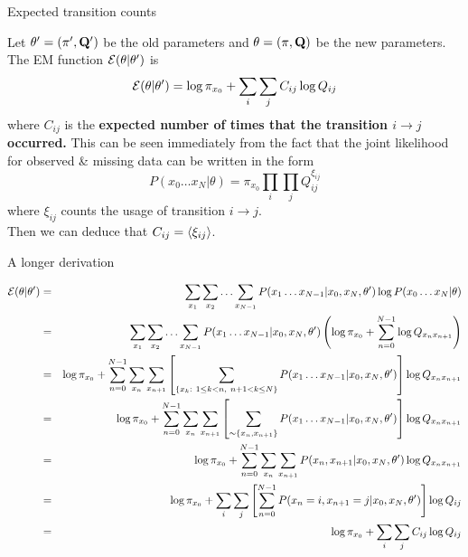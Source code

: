 \documentclass{beamer}
\begin{document}
\begin{frame}{Expected transition counts}
 \itemb
 \item Let $\theta' = (\pi', {\bf Q}')$ be the old parameters and $\theta = (\pi, {\bf Q})$ be the new parameters.
The EM function ${\cal E}(\theta|\theta')$ is
\[
{\cal E}(\theta|\theta') = \log \pi_{x_0} + \sum_i \sum_j C_{ij} \log Q_{ij}
\]
where $C_{ij}$ is the {\bf expected number of times that the transition $i \to j$ occurred.}
This can be seen immediately from the fact that the joint likelihood for observed \& missing data can be written in the form
\[
P(x_0 \ldots x_N | \theta) = \pi_{x_0} \prod_i \prod_j Q_{ij}^{\xi_{ij}}
\]
where $\xi_{ij}$ counts the usage of transition $i \to j$. \\
Then we can deduce that $C_{ij} = \langle \xi_{ij} \rangle$.
 \iteme
\end{frame}

\begin{frame}{A longer derivation}

\tiny
\begin{eqnarray*}
{\cal E}(\theta|\theta')
& = & \sum_{x_1} \sum_{x_2} \ldots \sum_{x_{N-1}} P(x_1 \ldots x_{N-1} | x_0, x_N, \theta') \log P(x_0 \ldots x_N | \theta) \\
& = & \sum_{x_1} \sum_{x_2} \ldots \sum_{x_{N-1}} P(x_1 \ldots x_{N-1} | x_0, x_N, \theta') \left( \log \pi_{x_0} + \sum_{n=0}^{N-1} \log Q_{x_n x_{n+1}} \right) \\
& = & \log \pi_{x_0} + \sum_{n=0}^{N-1} \sum_{x_n} \sum_{x_{n+1}}
\left[ \sum_{\{x_k:\ 1 \leq k < n,\ n+1 < k \leq N\}} P(x_1 \ldots x_{N-1} | x_0, x_N, \theta') \right]
\log Q_{x_n x_{n+1}} \\
& = & \log \pi_{x_0} + \sum_{n=0}^{N-1} \sum_{x_n} \sum_{x_{n+1}}
\left[ \sum_{ \sim \{ x_n,x_{n+1} \} } P(x_1 \ldots x_{N-1} | x_0, x_N, \theta') \right]
\log Q_{x_n x_{n+1}} \\
& = & \log \pi_{x_0} +\sum_{n=0}^{N-1} \sum_{x_n} \sum_{x_{n+1}} P(x_n,x_{n+1}|x_0,x_N,\theta') \log Q_{x_n x_{n+1}} \\
& = & \log \pi_{x_0} + \sum_i \sum_j \left[ \sum_{n=0}^{N-1} P(x_n=i,x_{n+1}=j|x_0,x_N,\theta') \right] \log Q_{ij} \\
& = & \log \pi_{x_0} + \sum_i \sum_j C_{ij} \log Q_{ij}
\end{eqnarray*}
\end{frame}
\end{document}

